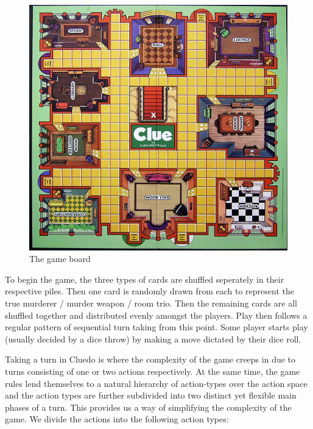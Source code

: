 \documentclass[msc, ai, logo, twoside, notimes, parskip, leftchapter, normalheadings]{infthesis}
\begin{document}
\begin{figure}[h]
\caption{The game board}
\centering
\includegraphics[scale=.825]{figures/board}
\end{figure}

To begin the game, the three types of cards are shuffled seperately in their respective piles. Then one card is randomly drawn from each to represent the true murderer / murder weapon / room trio. Then the remaining cards are all shuffled together and distributed evenly amongst the players. Play then follows a regular pattern of sequential turn taking from this point. Some player starts play (usually decided by a dice throw) by making a move dictated by their dice roll. 

Taking a turn in Cluedo is where the complexity of the game creeps in due to turns consisting of one or two actions respectively. At the same time, the game rules lend themselves to a natural hierarchy of action-types over the action space and the action types are further subdivided into two distinct yet flexible main phases of a turn. This provides us a way of simplifying the complexity of the game. We divide the actions into the following action types:
\end{document}

